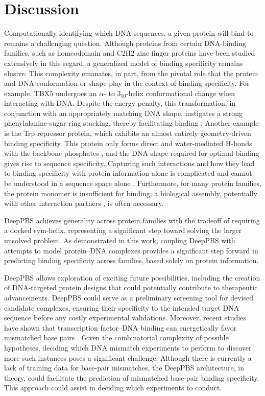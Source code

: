 \section{Discussion}

Computationally identifying which DNA sequences, a given protein will bind to remains a challenging question. Although proteins from certain DNA-binding families, such as homeodomain \citep{Christensen2012, Dror2014, noyes2008analysis, Wetzel2022} and C2H2 zinc finger proteins \citep{Wetzel2022, Persikov2014, persikov2009predicting, meseguer2020prediction, Persikov2011, persikov2015systematic} have been studied extensively in this regard, a generalized model of binding specificity remains elusive. This complexity emanates, in part, from the pivotal role that the protein and DNA conformation or shape play in the context of binding specificity. For example, TBX5 undergoes an $\alpha$- to $3_{10}$-helix conformational change when interacting with DNA. Despite the energy penalty, this transformation, in conjunction with an appropriately matching DNA shape, instigates a strong phenylalanine-sugar ring stacking, thereby facilitating binding \citep{Stirnimann2010}. Another example is the Trp repressor protein, which exhibits an almost entirely geometry-driven binding specificity. This protein only forms direct and water-mediated H-bonds with the backbone phosphates \citep{Otwinowski1988}, and the DNA shape required for optimal binding gives rise to sequence specificity. Capturing such interactions and how they lead to binding specificity with protein information alone is complicated and cannot be understood in a sequence space alone \citep{Chiu2023, Zhou2015}. Furthermore, for many protein families, the protein monomer is insufficient \citep{Kitayner2006} for binding; a biological assembly, potentially with other interaction partners \citep{Nair2003}, is often necessary.
\par
DeepPBS achieves generality across protein families with the tradeoff of requiring a docked sym-helix, representing a significant step toward solving the larger unsolved problem. As demonstrated in this work, coupling DeepPBS with attempts to model protein–DNA complexes provides a significant step forward in predicting binding specificity across families, based solely on protein information.
\par
DeepPBS allows exploration of exciting future possibilities, including the creation of DNA-targeted protein designs that could potentially contribute to therapeutic advancements. DeepPBS could serve as a preliminary screening tool for devised candidate complexes, ensuring their specificity to the intended target DNA sequence before any costly experimental validations. Moreover, recent studies have shown that transcription factor–DNA binding can energetically favor mismatched base pairs \citep{afek2020dna}. Given the combinatorial complexity of possible hypotheses, deciding which DNA mismatch experiments to perform to discover more such instances poses a significant challenge. Although there is currently a lack of training data for base-pair mismatches, the DeepPBS architecture, in theory, could facilitate the prediction of mismatched base-pair binding specificity. This approach could assist in deciding which experiments to conduct.
